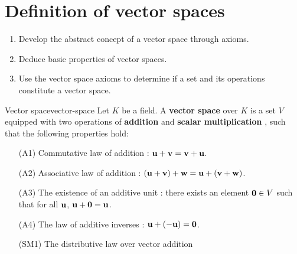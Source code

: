 \section{Definition of vector spaces}

\begin{outcome}
  \begin{enumerate}
  \item Develop the abstract concept of a vector space through axioms.
  \item Deduce basic properties of vector spaces.
  \item Use the vector space axioms to determine if a set and its
    operations constitute a vector space.
  \end{enumerate}
\end{outcome}

\begin{definition}{Vector space}{vector-space}
  Let $K$ be a field. A \textbf{vector space} over $K$%
   is a set $V$ equipped with two operations of
  \textbf{addition}%
    and
  \textbf{scalar multiplication}%
  , such that the following properties hold:
  \begin{itemize}\setlength\itemsep{0em}
  \item[(A1)] Commutative law of addition%
    :
    $\mbox{\bf u} + \mbox{\bf v}=\mbox{\bf v} + \mbox{\bf u}$.
  \item[(A2)] Associative law of addition%
    :
    $(\mbox{\bf u} + \mbox{\bf v}) + \mbox{\bf w}=\mbox{\bf u} + (\mbox{\bf v} + \mbox{\bf w})$.
  \item[(A3)] The existence of an additive unit%
    : there exists an element $\mbox{\bf 0}\in
    V$ such that for all $\mbox{\bf u}$,
    $\mbox{\bf u} + \mbox{\bf 0}=\mbox{\bf u}$.
  \item[(A4)] The law of additive inverses%
    :
    $\mbox{\bf u} + (-\mbox{\bf u}) =\mbox{\bf 0}$.
  \item[(SM1)] The distributive law over vector addition%

\end{itemize}
\end{definition}
